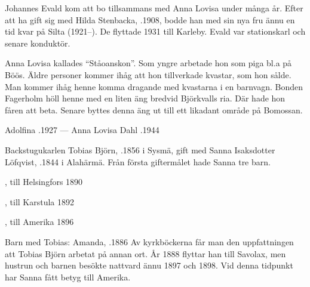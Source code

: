 Johannes Evald kom att bo tillsammans med Anna Lovisa under många år. Efter att ha gift sig med Hilda Stenbacka,  .1908, bodde han med sin nya fru ännu en tid kvar på Silta (1921--). De flyttade 1931 till Karleby. Evald var stationskarl och senare konduktör.

Anna Lovisa kallades ``Ståoanskon''. Som yngre arbetade hon som piga bl.a på Böös. Äldre personer kommer ihåg att hon tillverkade kvastar, som hon sålde. Man kommer ihåg henne komma dragande med kvastarna i en barnvagn. Bonden Fagerholm höll henne med en liten äng bredvid Björkvalls ria. Där hade hon fåren att beta.  Senare byttes denna äng ut till ett likadant område på Bomossan.

Adolfina .1927  ---  Anna Lovisa Dahl .1944


Backstugukarlen Tobias Björn, .1856 i Sysmä, gift med Sanna Isaksdotter Löfqvist, .1844 i Alahärmä.
Från första giftermålet hade Sanna tre barn.
\begin{jhchildren}
  \item {}, till Helsingfors 1890
  \item {}, till Karstula 1892
  \item {}, till Amerika 1896
\end{jhchildren}

Barn med Tobias: Amanda, .1886
Av kyrkböckerna får man den uppfattningen att Tobias Björn arbetat på annan ort. År 1888 flyttar han till Savolax, men hustrun och barnen besökte nattvard ännu 1897 och 1898. Vid denna tidpunkt har Sanna fått betyg till Amerika.


